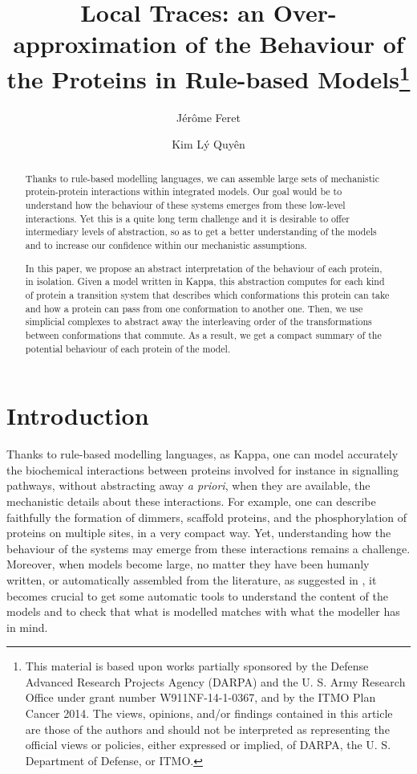 \documentclass[10pt,a4paper]{llncs}
\author{J{\'e}r{\^o}me Feret\inst{1} \and  Kim L\'y Quy\^en\inst{1}}
\title{Local Traces: an Over-approximation of the Behaviour of the
  Proteins in Rule-based Models\thanks{This material is based upon
works partially sponsored by the Defense Advanced Research Projects Agency (DARPA) and the U. S. Army Research Office under grant number W911NF-14-1-0367,  and by the ITMO Plan Cancer 2014. The views, opinions, and/or findings contained in this article are those of the authors and should not be interpreted as representing the official views or policies, either expressed or implied, of DARPA, the U. S. Department of Defense, or ITMO.}}
\institute{DI-ENS  (INRIA/{\'E}NS/CNRS/PSL$^\star$), Paris, France   \\ \email{feret@ens.fr}, \email{quyen@di.ens.fr}}
\newcommand{\beforesection}{\vspace*{-4pt}}
\renewcommand{\beforesection}{}
\begin{document}
\maketitle

\vspace*{-8pt}

\begin{abstract}
Thanks to rule-based modelling languages, we can assemble
large sets of mechanistic protein-protein interactions within
integrated models. Our goal would be to understand how the behaviour
of these systems emerges from these low-level interactions. Yet this
is a quite long term challenge and it is desirable to offer intermediary levels of abstraction, so as to get a better
understanding of the models and to increase our confidence within our mechanistic assumptions. %

In this paper, we propose an abstract interpretation of the behaviour of each protein, in isolation.
Given a model written in Kappa, this abstraction computes for each kind of protein a transition system that describes which conformations this protein can take and how a protein can pass from one conformation to another one. Then, we use simplicial complexes to abstract away the interleaving order of the transformations between conformations that commute. As a result, we get a compact summary of the potential behaviour of each protein of the model.
\end{abstract}


\beforesection

\section{Introduction}

\beforesection

Thanks to rule-based modelling languages, as Kappa, one can model accurately
the biochemical interactions between proteins involved for instance in signalling pathways, without abstracting away \emph{a priori}, when they are available, the mechanistic details about these interactions. For example, one can describe
faithfully the formation of dimmers, scaffold proteins, and the phosphorylation of proteins on multiple sites, in a very compact way. Yet, understanding how the behaviour of the systems may emerge from these interactions remains a challenge.
Moreover, when models become large, no matter they have been humanly written, or automatically assembled from the literature, as suggested in \cite{DARPA}, it becomes crucial to get some automatic tools to understand the content of the models and to check that what is modelled matches with what the modeller has in mind.
\end{document}
